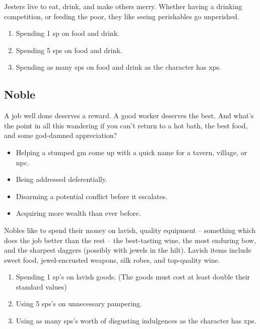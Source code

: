 \begin{multicols}{2}
Jesters live to eat, drink, and make others merry.
Whether having a drinking competition, or feeding the poor, they like seeing perishables go unperished.

\begin{enumerate}
  \item
  Spending 1 \gls{sp} on food and drink.
  \item
  Spending 5 \glspl{sp} on food and drink.
  \item
  Spending as many \glspl{sp} on food and drink as the character has \glspl{xp}.
\end{enumerate}

\null
\subsection{Noble}
\label{noble}

A job well done deserves a reward.
A good worker deserves the best.
And what's the point in all this wandering if you can't return to a hot bath, the best food, and some god-damned appreciation?

\begin{itemize}

  \item
  Helping a stumped \gls{gm} come up with a quick name for a tavern, \gls{village}, or \gls{npc}.
  \item
  Being addressed deferentially.
  \item
  Disarming a potential conflict before it escalates.
  \item
  Acquiring more wealth than ever before.

\end{itemize}

Nobles like to spend their money on lavish, quality equipment -- something which does the job better than the rest -- the best-tasting wine, the most enduring bow, and the sharpest daggers (possibly with jewels in the hilt).
Lavish items include sweet food, jewel-encrusted weapons, silk robes, and top-quality wine.

\begin{enumerate}
  \item
  Spending 1 \gls{sp}'s on lavish goods.
  (The goods must cost at least double their standard values)
  \item
  Using 5 \glspl{sp}'s on unnecessary pampering.
  \item
  Using as many \glspl{sp}'s worth of disgusting indulgences as the character has \glspl{xp}.
\end{enumerate}


\end{multicols}
